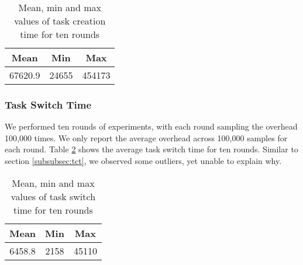 \begin{table}[htb]

    \caption{Mean, min and max values of task creation time for ten rounds}
\begin{tabular}{|c|c|c|} 
    \hline
    Mean & Min & Max \\ 
    \hline
    67620.9 & 24655 & 454173 \\ 
    \hline
   \end{tabular}
    \label{tab:t4}
\end{table}

\subsubsection{Task Switch Time}
We performed ten rounds of experiments, with each round sampling the overhead 100,000 times. We only report the average overhead across 100,000 samples for each round.
Table \ref{tab:t5} shows the average task switch time for ten rounds. Similar to section \ref{subsubsec:tct}, we observed some outliers, yet unable to explain why.



\begin{table}[htb]

    \caption{Mean, min and max values of task switch time for ten rounds}
 
\begin{tabular}{|c|c|c|} 
    \hline
    Mean & Min & Max \\ 
    \hline
    6458.8 & 2158 & 45110 \\ 
    \hline
   \end{tabular}
    \label{tab:t5}
\end{table}